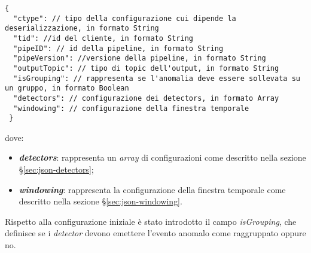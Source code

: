 \begin{verbatim}
{
  "ctype": // tipo della configurazione cui dipende la deserializzazione, in formato String
  "tid": //id del cliente, in formato String
  "pipeID": // id della pipeline, in formato String
  "pipeVersion": //versione della pipeline, in formato String
  "outputTopic": // tipo di topic dell'output, in formato String
  "isGrouping": // rappresenta se l'anomalia deve essere sollevata su un gruppo, in formato Boolean
  "detectors": // configurazione dei detectors, in formato Array
  "windowing": // configurazione della finestra temporale
 }
\end{verbatim}
dove:
\begin{itemize}
	\item{\textbf{\textit{detectors}}: rappresenta un \textit{array} di configurazioni come descritto nella sezione \S\ref{sec:json-detectors}};
	\item{\textbf{\textit{windowing}}: rappresenta la configurazione della finestra temporale come descritto nella sezione \S\ref{sec:json-windowing}.}
\end{itemize}

Rispetto alla configurazione iniziale è stato introdotto il campo \textit{isGrouping}, che definisce se i \textit{detector} devono emettere l'evento anomalo come raggruppato oppure no.

